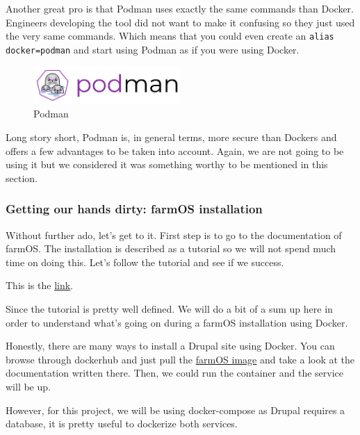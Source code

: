 Another great pro is that Podman uses exactly the same commands than Docker. Engineers developing the tool did not want to make it confusing so they just used the very same commands. Which means that you could even create an \verb|alias docker=podman| and start using Podman as if you were using Docker.

\begin{figure}[H]
    \centering
    \includegraphics[width=0.5\textwidth]{fig/podman_logo.png}
        \caption{Podman}
    \label{fig:podman-logo}
\end{figure}


Long story short, Podman is, in general terms, more secure than Dockers and offers a few advantages to be taken into account. Again, we are not going to be using it but we considered it was something worthy to be mentioned in this section.

\vspace{7mm}
\subsubsection{Getting our hands dirty: farmOS installation}
Without further ado, let's get to it. First step is to go to the documentation of farmOS. The installation is described as a tutorial so we will not spend much time on doing this. Let's follow the tutorial and see if we success. 

This is the \href{https://farmos.org/hosting/docker/}{link}.

Since the tutorial is pretty well defined. We will do a bit of a sum up here in order to understand what's going on during a farmOS installation using Docker.

Honestly, there are many ways to install a Drupal site using Docker. You can browse through dockerhub\cite{dockerhub} and just pull the \href{https://hub.docker.com/r/farmos/farmos}{farmOS image} and take a look at the documentation written there. Then, we could run the container and the service will be up.

However, for this project, we will be using docker-compose as Drupal requires a database, it is pretty useful to dockerize both services.

